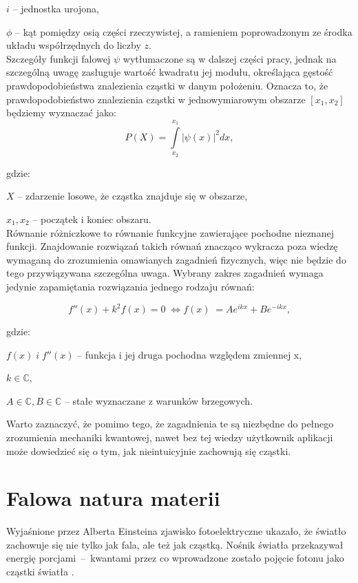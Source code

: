 \documentclass{SGGW-thesis}
\begin{document}
	$i$ -- jednostka urojona,
	
	$\phi$ -- kąt pomiędzy osią części rzeczywistej, a ramieniem poprowadzonym ze środka układu współrzędnych do liczby $z$.\\
	
	Szczegóły funkcji falowej $\psi$ wytłumaczone są w dalszej części pracy, jednak na szczególną uwagę zasługuje wartość kwadratu jej modułu, określająca gęstość prawdopodobieństwa znalezienia cząstki w danym położeniu. Oznacza to, że prawdopodobieństwo znalezienia cząstki w jednowymiarowym obszarze $[x_1, x_2]$ będziemy wyznaczać jako:
	\begin{equation}
	P(X) = \int\limits_{x_2}^{x_1} |\psi(x)|^2dx,
	\end{equation}
	
	gdzie:
	
	$X$ -- zdarzenie losowe, że cząstka znajduje się w obszarze,
	
	$x_1, x_2$ -- początek i koniec obszaru.\\ 	
	
	Równanie różniczkowe to równanie funkcyjne zawierające pochodne nieznanej funkcji. Znajdowanie rozwiązań takich równań znacząco wykracza poza wiedzę wymaganą do zrozumienia omawianych zagadnień fizycznych, więc nie będzie do tego przywiązywana szczególna uwaga. Wybrany zakres zagadnień wymaga jedynie zapamiętania rozwiązania jednego rodzaju równań:
	
	\begin{equation}
	f''(x)+k^2f(x)=0 \;\Longleftrightarrow f(x)\; = Ae^{ikx} + Be^{-ikx},
	\end{equation}

	gdzie:
	
	$f(x) \; i \; f''(x)$ -- funkcja i jej druga pochodna względem zmiennej x,

	$k \in \mathbb{C}$,
		
	$A \in \mathbb{C}, B \in \mathbb{C}$ -- stałe wyznaczane z warunków brzegowych.
	
	

	Warto zaznaczyć, że pomimo tego, że zagadnienia te są niezbędne do pełnego zrozumienia mechaniki kwantowej, nawet bez tej wiedzy użytkownik aplikacji może dowiedzieć się o tym, jak nieintuicyjnie zachowują się cząstki.
	\section{Falowa natura materii}
	Wyjaśnione przez Alberta Einsteina zjawisko fotoelektryczne ukazało, że światło zachowuje się nie tylko jak fala, ale też jak cząstką. Nośnik światła przekazywał energię porcjami~--~kwantami przez co wprowadzone zostało pojęcie fotonu jako cząstki światła \cite{fiz atom} \cite{mechanika kwant} \cite{fiz kwant} \cite{lewis}.
	
\end{document}
